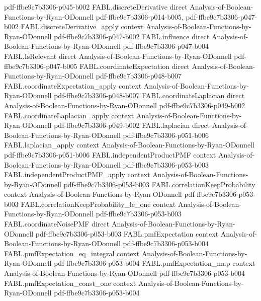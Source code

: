 \begin{theorem}
  {pdf-ffbe9c7b3306-p045-b002}
\proofstep
  {FABL.discreteDerivative}
  {direct}
  {Analysis-of-Boolean-Functions-by-Ryan-ODonnell}
  {pdf-ffbe9c7b3306-p014-b005,
    pdf-ffbe9c7b3306-p047-b002}
\proofstep
  {FABL.discreteDerivative_apply}
  {context}
  {Analysis-of-Boolean-Functions-by-Ryan-ODonnell}
  {pdf-ffbe9c7b3306-p047-b002}
\proofstep
  {FABL.influence}
  {direct}
  {Analysis-of-Boolean-Functions-by-Ryan-ODonnell}
  {pdf-ffbe9c7b3306-p047-b004}
\proofstep
  {FABL.IsRelevant}
  {direct}
  {Analysis-of-Boolean-Functions-by-Ryan-ODonnell}
  {pdf-ffbe9c7b3306-p047-b005}
\proofstep
  {FABL.coordinateExpectation}
  {direct}
  {Analysis-of-Boolean-Functions-by-Ryan-ODonnell}
  {pdf-ffbe9c7b3306-p048-b007}
\proofstep
  {FABL.coordinateExpectation_apply}
  {context}
  {Analysis-of-Boolean-Functions-by-Ryan-ODonnell}
  {pdf-ffbe9c7b3306-p048-b007}
\proofstep
  {FABL.coordinateLaplacian}
  {direct}
  {Analysis-of-Boolean-Functions-by-Ryan-ODonnell}
  {pdf-ffbe9c7b3306-p049-b002}
\proofstep
  {FABL.coordinateLaplacian_apply}
  {context}
  {Analysis-of-Boolean-Functions-by-Ryan-ODonnell}
  {pdf-ffbe9c7b3306-p049-b002}
\proofstep
  {FABL.laplacian}
  {direct}
  {Analysis-of-Boolean-Functions-by-Ryan-ODonnell}
  {pdf-ffbe9c7b3306-p051-b006}
\proofstep
  {FABL.laplacian_apply}
  {context}
  {Analysis-of-Boolean-Functions-by-Ryan-ODonnell}
  {pdf-ffbe9c7b3306-p051-b006}
\proofstep
  {FABL.independentProductPMF}
  {context}
  {Analysis-of-Boolean-Functions-by-Ryan-ODonnell}
  {pdf-ffbe9c7b3306-p053-b003}
\proofstep
  {FABL.independentProductPMF_apply}
  {context}
  {Analysis-of-Boolean-Functions-by-Ryan-ODonnell}
  {pdf-ffbe9c7b3306-p053-b003}
\proofstep
  {FABL.correlationKeepProbability}
  {context}
  {Analysis-of-Boolean-Functions-by-Ryan-ODonnell}
  {pdf-ffbe9c7b3306-p053-b003}
\proofstep
  {FABL.correlationKeepProbability_le_one}
  {context}
  {Analysis-of-Boolean-Functions-by-Ryan-ODonnell}
  {pdf-ffbe9c7b3306-p053-b003}
\proofstep
  {FABL.coordinateNoisePMF}
  {direct}
  {Analysis-of-Boolean-Functions-by-Ryan-ODonnell}
  {pdf-ffbe9c7b3306-p053-b003}
\proofstep
  {FABL.pmfExpectation}
  {context}
  {Analysis-of-Boolean-Functions-by-Ryan-ODonnell}
  {pdf-ffbe9c7b3306-p053-b004}
\proofstep
  {FABL.pmfExpectation_eq_integral}
  {context}
  {Analysis-of-Boolean-Functions-by-Ryan-ODonnell}
  {pdf-ffbe9c7b3306-p053-b004}
\proofstep
  {FABL.pmfExpectation_map}
  {context}
  {Analysis-of-Boolean-Functions-by-Ryan-ODonnell}
  {pdf-ffbe9c7b3306-p053-b004}
\proofstep
  {FABL.pmfExpectation_const_one}
  {context}
  {Analysis-of-Boolean-Functions-by-Ryan-ODonnell}
  {pdf-ffbe9c7b3306-p053-b004}

\end{theorem}
